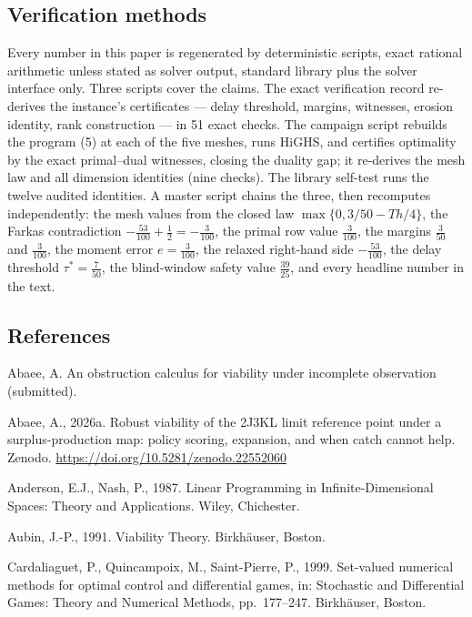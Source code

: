 \documentclass[10pt,twocolumn]{article}
\theoremstyle{plain}
\theoremstyle{definition}
\theoremstyle{remark}
\begin{document}
\subsection{Verification methods}\label{methods}

Every number in this paper is regenerated by deterministic scripts, exact
rational arithmetic unless stated as solver output, standard library plus
the solver interface only. Three scripts cover the claims. The exact
verification record re-derives the instance's certificates --- delay
threshold, margins, witnesses, erosion identity, rank construction ---
in 51 exact checks. The campaign script rebuilds the program (5) at each of
the five meshes, runs HiGHS, and certifies optimality by the exact
primal--dual witnesses, closing the duality gap; it re-derives the mesh law
and all dimension identities (nine checks). The library self-test runs the
twelve audited identities. A master script chains the three, then
recomputes independently: the mesh values from the closed law
\(\max\{0, 3/50 - Th/4\}\), the Farkas contradiction
\(-\tfrac{53}{100} + \tfrac12 = -\tfrac{3}{100}\), the primal row value
\(\tfrac{3}{100}\), the margins \(\tfrac{3}{50}\) and \(\tfrac{3}{100}\),
the moment error \(e = \tfrac{3}{100}\), the relaxed right-hand side
\(-\tfrac{53}{100}\), the delay threshold \(\tau^{*} = \tfrac{7}{50}\), the
blind-window safety value \(\tfrac{39}{25}\), and every headline number in
the text.

\subsection*{References}

Abaee, A. An obstruction calculus for viability under incomplete
observation (submitted).

Abaee, A., 2026a. Robust viability of the 2J3KL limit reference point
under a surplus-production map: policy scoring, expansion, and when catch
cannot help. Zenodo. \url{https://doi.org/10.5281/zenodo.22552060}

Anderson, E.J., Nash, P., 1987. Linear Programming in Infinite-Dimensional
Spaces: Theory and Applications. Wiley, Chichester.

Aubin, J.-P., 1991. Viability Theory. Birkh\"auser, Boston.

Cardaliaguet, P., Quincampoix, M., Saint-Pierre, P., 1999. Set-valued
numerical methods for optimal control and differential games, in:
Stochastic and Differential Games: Theory and Numerical Methods,
pp.~177--247. Birkh\"auser, Boston.
\end{document}
